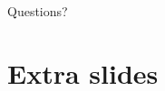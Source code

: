 \documentclass[10pt,show notes on second screen]{beamer}
\begin{document}
\begin{frame}
\begin{center}
Questions?
\end{center}
\tiny

\end{frame}

\section{Extra slides}

\end{document}
